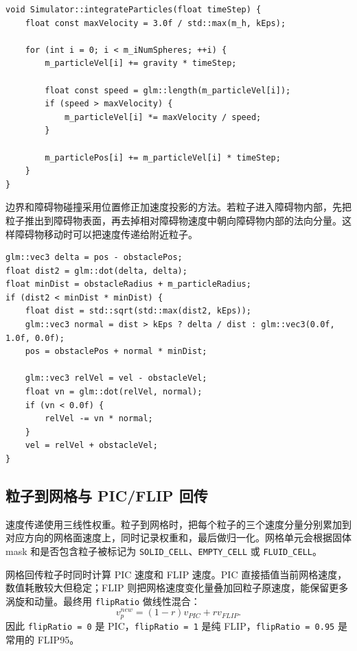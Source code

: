 \documentclass[UTF8,a4paper,11pt]{ctexart}
\begin{document}
\begin{lstlisting}[style=cppstyle,caption={粒子积分与速度限制}]
void Simulator::integrateParticles(float timeStep) {
    float const maxVelocity = 3.0f / std::max(m_h, kEps);

    for (int i = 0; i < m_iNumSpheres; ++i) {
        m_particleVel[i] += gravity * timeStep;

        float const speed = glm::length(m_particleVel[i]);
        if (speed > maxVelocity) {
            m_particleVel[i] *= maxVelocity / speed;
        }

        m_particlePos[i] += m_particleVel[i] * timeStep;
    }
}
\end{lstlisting}

边界和障碍物碰撞采用位置修正加速度投影的方法。若粒子进入障碍物内部，先把粒子推出到障碍物表面，再去掉相对障碍物速度中朝向障碍物内部的法向分量。这样障碍物移动时可以把速度传递给附近粒子。

\begin{lstlisting}[style=cppstyle,caption={球形障碍物的碰撞处理}]
glm::vec3 delta = pos - obstaclePos;
float dist2 = glm::dot(delta, delta);
float minDist = obstacleRadius + m_particleRadius;
if (dist2 < minDist * minDist) {
    float dist = std::sqrt(std::max(dist2, kEps));
    glm::vec3 normal = dist > kEps ? delta / dist : glm::vec3(0.0f, 1.0f, 0.0f);
    pos = obstaclePos + normal * minDist;

    glm::vec3 relVel = vel - obstacleVel;
    float vn = glm::dot(relVel, normal);
    if (vn < 0.0f) {
        relVel -= vn * normal;
    }
    vel = relVel + obstacleVel;
}
\end{lstlisting}

\subsection{粒子到网格与 PIC/FLIP 回传}

速度传递使用三线性权重。粒子到网格时，把每个粒子的三个速度分量分别累加到对应方向的网格面速度上，同时记录权重和，最后做归一化。网格单元会根据固体 mask 和是否包含粒子被标记为 \texttt{SOLID\_CELL}、\texttt{EMPTY\_CELL} 或 \texttt{FLUID\_CELL}。

网格回传粒子时同时计算 PIC 速度和 FLIP 速度。PIC 直接插值当前网格速度，数值耗散较大但稳定；FLIP 则把网格速度变化量叠加回粒子原速度，能保留更多涡旋和动量。最终用 \texttt{flipRatio} 做线性混合：
\[
v_p^{new} = (1-r)v_{PIC} + r v_{FLIP}.
\]
因此 \texttt{flipRatio = 0} 是 PIC，\texttt{flipRatio = 1} 是纯 FLIP，\texttt{flipRatio = 0.95} 是常用的 FLIP95。
\end{document}
